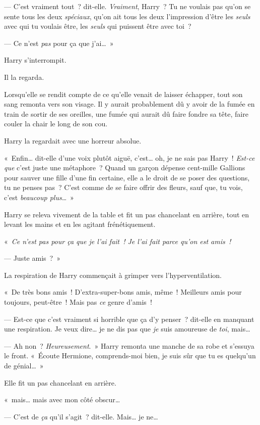 --- C'est vraiment tout~? dit-elle.
\emph{Vraiment}, Harry~?
Tu ne voulais pas qu'on se sente tous les deux \emph{spéciaux}, qu'on ait tous les deux l'impression d'être les \emph{seuls} avec qui tu voulais être, les \emph{seuls} qui puissent être avec toi~?

--- Ce n'est \emph{pas} pour ça que j'ai…~»

Harry s'interrompit.

Il la regarda.

Lorsqu'elle se rendit compte de ce qu'elle venait de laisser échapper, tout son sang remonta vers son visage.
Il y aurait probablement dû y avoir de la fumée en train de sortir de ses oreilles, une fumée qui aurait dû faire fondre sa tête, faire couler la chair le long de son cou.

Harry la regardait avec une horreur absolue.

«~Enfin… dit-elle d'une voix plutôt aiguë, c'est… oh, je ne sais pas Harry~!
\emph{Est-ce que} c'est juste une métaphore~?
Quand un garçon dépense cent-mille Gallions pour sauver une fille d'une fin certaine, elle a le droit de se poser des questions, tu ne penses pas~?
C'est comme de se faire offrir des fleurs, sauf que, tu vois, c'est \emph{beaucoup plus}…~»

Harry se releva vivement de la table et fit un pas chancelant en arrière, tout en levant les mains et en les agitant frénétiquement.

«~\emph{Ce n'est pas pour ça que je l'ai fait~!
Je l'ai fait parce qu'on est amis~!}

--- Juste amis~?~»

La respiration de Harry commençait à grimper vers l'hyperventilation.

«~De très bons amis~!
D'extra-super-bons amis, même~!
Meilleurs amis pour toujours, peut-être~!
Mais pas \emph{ce} genre d'amis~!

--- Est-ce que c'est vraiment si horrible que ça d'y penser~? dit-elle en manquant une respiration.
Je veux dire… je ne dis pas que \emph{je} suis amoureuse de \emph{toi}, mais…

--- Ah non~?
\emph{Heureusement}.~»
Harry remonta une manche de sa robe et s'essuya le front.
«~Écoute Hermione, comprends-moi bien, je suis sûr que tu es quelqu'un de génial…~»

Elle fit un pas chancelant en arrière.

«~mais… mais avec mon côté obscur…

--- C'est de \emph{ça} qu'il s'agit~? dit-elle.
Mais… je ne…

